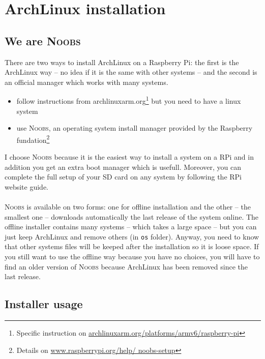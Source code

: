 \chapter{ArchLinux installation}
\section{We are \textsc{Noobs}}
There are two ways to install ArchLinux on a Raspberry Pi: the first is 
the ArchLinux way -- no idea if it is the same with other systems -- and 
the second is an official manager which works with many systems.

\begin{itemize}
	\item follow instructions from archlinuxarm.org\footnote{Specific 
		  instruction on \href{http://archlinuxarm.org/platforms/armv6/
		  raspberry-pi}{archlinuxarm.org/platforms/armv6/raspberry-pi}} but 
		  you need to have a linux system
		  
	\item use \textsc{Noobs}, an operating system install manager provided by 
		  the Raspberry fundation\footnote{Details on \href{http://
		  www.raspberrypi.org/help/noobs-setup}{www.raspberrypi.org/help/
		  noobs-setup}}\\
\end{itemize}

I choose \textsc{Noobs} because it is the easiest way to install a
system on a RPi and in addition you get an extra \og{}boot manager\fg{} which 
is usefull. Moreover, you can complete the full setup of your SD card on any 
system by following the RPi website guide.
\\\\
\textsc{Noobs} is available on two forms: one for offline installation 
and the other -- the smallest one -- downloads automatically the last release 
of the system online. The offline installer contains many systems -- which 
takes a large space -- but you can just keep ArchLinux and remove others 
(in \texttt{os} folder). Anyway, you need to know that other systems files 
will be keeped after the installation so it is loose space. If you still want 
to use the offline way because you have no choices, you will have to find  
an older version of \textsc{Noobs} because ArchLinux has been removed since  
the last release.

\section{Installer usage}

%
